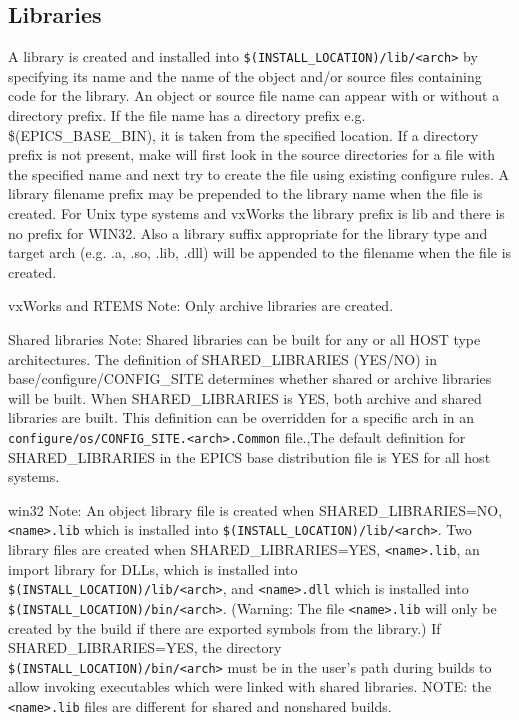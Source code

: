 \subsection{Libraries}

A library is created and installed into \verb|$(INSTALL_LOCATION)/lib/<arch>| by specifying its name and the name of the 
object and/or source files containing code for the library. An object or source file name can appear with or without a 
directory prefix. If the file name has a directory prefix e.g. \$(EPICS\_BASE\_BIN), it is taken from the specified location. 
If a directory prefix is not present, make will first look in the source directories for a file with the specified name and next 
try to create the file using existing configure rules. A library filename prefix may be prepended to the library name when 
the file is created. For Unix type systems and vxWorks the library prefix is lib and there is no prefix for WIN32. Also a 
library suffix appropriate for the library type and target arch (e.g. .a, .so, .lib, .dll) will be appended to the filename when 
the file is created.

vxWorks and RTEMS Note: Only archive libraries are created.

Shared libraries Note: Shared libraries can be built for any or all HOST type architectures. The definition of 
SHARED\_LIBRARIES (YES/NO) in base/configure/CONFIG\_SITE determines whether shared or archive libraries will 
be built. When SHARED\_LIBRARIES is YES, both archive and shared libraries are built. This definition can be 
overridden for a specific arch in an \verb|configure/os/CONFIG_SITE.<arch>.Common| file.,The default definition for 
SHARED\_LIBRARIES in the EPICS base distribution file is YES for all host systems.

win32 Note: An object library file is created when SHARED\_LIBRARIES=NO, \verb|<name>.lib| which is installed into 
\verb|$(INSTALL_LOCATION)/lib/<arch>|. Two library files are created when SHARED\_LIBRARIES=YES, \verb|<name>.lib|, an 
import library for DLLs, which is installed into \verb|$(INSTALL_LOCATION)/lib/<arch>|, and \verb|<name>.dll| which is installed 
into \verb|$(INSTALL_LOCATION)/bin/<arch>|. (Warning: The file \verb|<name>.lib| will only be created by the build if there are 
exported symbols from the library.) If SHARED\_LIBRARIES=YES, the directory \\
\verb|$(INSTALL_LOCATION)/bin/<arch>| 
must be in the user's path during builds to allow invoking executables which were linked with shared libraries. NOTE: the 
\verb|<name>.lib| files are different for shared and nonshared builds.

